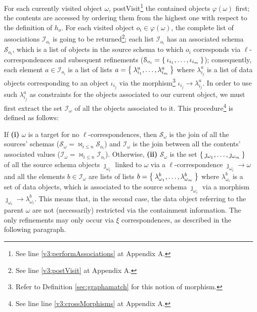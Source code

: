 \begin{example}[continues=ex:examplegraphdata,label=ex:examplereferencedOcaml]
For each currently visited object $\omega$, postVisit\footnote{See  line \vref{v3:performAssociations} at Appendix A.} the contained objects $\varphi(\omega)$ first; the contents are accessed by ordering them from the highest one with respect to the definition of $h_o$. For each visited object $o_i\in\varphi(\omega)$, the complete list of associations $\mathcal{I}_{o_i}$ is going to be returned\footnote{See line \vref{v3:postVisit} at Appendix A.}; each list $\mathcal{I}_{o_i}$ has an associated schema $\mathcal{S}_{o_i}$, which is a list of objects in the source schema to which $o_i$ corresponds via $\ell$-correspondences and subsequent refinements ($\mathcal{S}_{o_i}=\Set{\iota_{i_1},\dots,\iota_{i_m}}$); consequently, each element  $a\in \mathcal{I}_{o_i}$ is a list of lists $a=\Set{\lambda_{i_1}^a,\dots,\lambda_{i_m}^a }$ where $\lambda_{i_j}^a$ is a list of data objects corresponding to an object $\iota_{i_j}$ via the morphism\footnote{Refer to Definition \vref{sec:graphamatch} for this notion of morphism.} ${\iota_{i_j}}\to \lambda_{i_j}^a$. In order to use such $\lambda_{i_j}^a$ as constraints for the objects associated to our current object, we must first extract the set $\mathcal{I}_\omega$ of all the objects associated to it. This procedure\footnote{See line line \vref{v3:crossMorphisms} at Appendix A.} is defined as follows:
\medskip

	

{\narrower If \textbf{(i)} $\omega$ is a target for no $\ell$-correspondences, then $\mathcal{S}_\omega$ is the join of all the sources' schemas ($\mathcal{S}_\omega = \bowtie_{i\leq n} \mathcal{S}_{o_i}$) and $\mathcal{I}_\omega$ is the join between all the contents' associated values ($\mathcal{I}_\omega = \bowtie_{i\leq n}\mathcal{I}_{o_i}$). Otherwise, \textbf{(ii)}  $\mathcal{S}_\omega$ is the set $\Set{\jmath_{\omega_1},\dots,\jmath_{\omega_m}}$ of all the source schema objects $\jmath_{\omega_i}$ linked to $\omega$ via a $\ell$-correspondence $\jmath_{\omega_i}\to \omega$  and all the elements  $b\in \mathcal{I}_\omega$ are lists of lists $b=\Set{\lambda^b_{\omega_1},\dots,\lambda^b_{\omega_m}}$ where $\lambda^b_{\omega_i}$ is a set of data objects, which is associated to the source schema $\jmath_{\omega_i}$ via a morphism $\jmath_{\omega_i}\to \lambda^b_{\omega_i}$. This means that, in the second case, the data object referring to the parent $\omega$ are not (necessarily) restricted via the containment information. The only refinements may only occur via $\xi$ correspondences, as described in the following paragraph. \par}


\end{example}
